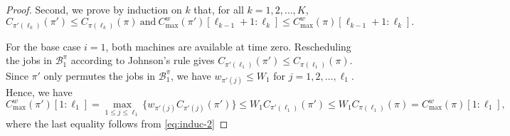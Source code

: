 \documentclass[12pt]{article} \textheight=24.5cm \textwidth=16.5cm \parskip = 0.165cm
\begin{document}
\begin{sloppypar}
\begin{proof}
            Second, we prove by induction on $k$ that, for all $k=1, 2, \ldots, K$,
            \begin{equation} \label{eq:induc-assump}
                C_{\pi'(\ell_k)} (\pi') \leq C_{\pi(\ell_k)}(\pi) ~ \mathrm{and}  ~ C_{\max}^w(\pi')[\ell_{k-1}+1:\ell_k] \leq C_{\max}^w(\pi)[\ell_{k-1}+1:\ell_k].
            \end{equation}
            
            For the base case $i=1$, both machines are available at time zero.
            Rescheduling the jobs in $\mathcal{B}_1^{\pi}$ according to Johnson's rule gives $C_{\pi'(\ell_1)}(\pi') \leq C_{\pi(\ell_1)}(\pi)$.
            Since $\pi'$ only permutes the jobs in $\mathcal{B}_1^{\pi}$, we have $w_{\pi'(j)} \leq W_1$ for $j=1, 2, \ldots, \ell_1$.
            Hence, we have
            \begin{equation*}
                C_{\max}^w(\pi')[1:\ell_1]= \max_{1 \leq j \leq \ell_1}\{w_{\pi'(j)}C_{\pi'(j)}(\pi')\} \leq W_1 C_{\pi'(\ell_1)}(\pi') \leq W_1 C_{\pi(\ell_1)}(\pi)=C_{\max}^w(\pi)[1:\ell_1],
            \end{equation*}
            where the last equality follows from \cref{eq:induc-2}
            

\end{proof}
\end{sloppypar}
\end{document}
